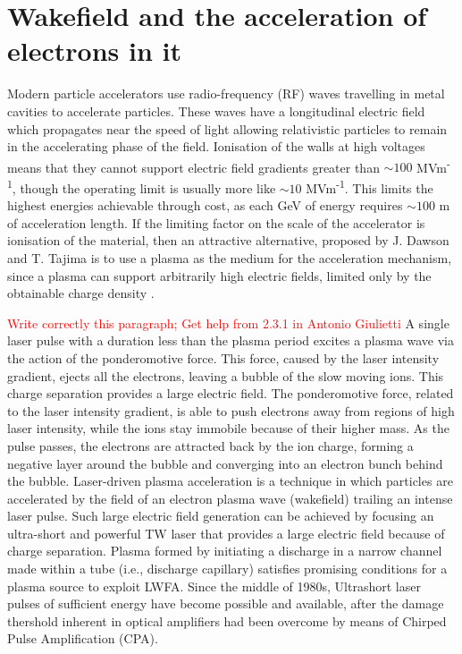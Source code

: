 \documentclass[nofonts]{tufte-book}
\begin{document}
\section{Wakefield and the acceleration of electrons in it}\label{sec:wakefield} 
Modern particle accelerators use radio-frequency (RF) waves travelling in metal cavities to accelerate particles. These waves have a longitudinal electric field which propagates near the speed of light allowing relativistic particles to remain in the accelerating phase of the field. Ionisation of the walls at high voltages means that they cannot support electric field gradients greater than $\sim 100$ MVm\textsuperscript{-1}, though the operating limit is usually more like $\sim 10$ MVm\textsuperscript{-1}. This limits the highest energies achievable through cost, as each GeV of energy requires $\sim 100$ m of acceleration length.
If the limiting factor on the scale of the accelerator is ionisation of the material, then an attractive alternative, proposed by J. Dawson and T. Tajima\cite{Tajima1979} is to use a plasma as the medium for the acceleration mechanism, since a plasma can support arbitrarily high electric fields, limited only by the obtainable charge density \cite{Esarey2009}.

\textcolor{red}{Write correctly this paragraph; Get help from 2.3.1 in Antonio Giulietti}
 A single laser pulse with a duration less than the plasma period excites a plasma wave via the action of the ponderomotive force. This force, caused by the laser intensity gradient, ejects all the electrons, leaving a bubble of the slow moving ions. This charge separation provides a large electric field. The ponderomotive force, related to the laser intensity gradient, is able to push electrons away from regions of high laser intensity, while the ions stay immobile because of their higher mass. As the pulse passes, the electrons are attracted back by the ion charge, forming a negative layer around the bubble and converging into an electron bunch behind the bubble.
Laser-driven plasma acceleration is a technique in which particles are accelerated by the field of an electron plasma wave (wakefield) trailing an intense laser pulse. Such large electric field generation can be achieved by focusing an ultra-short and powerful TW laser that provides a large electric field because of charge separation. Plasma formed by initiating a discharge in a narrow channel made within a tube (i.e., discharge capillary) satisfies promising
conditions for a plasma source to exploit LWFA. Since the middle of 1980s, Ultrashort laser pulses of sufficient energy have become possible and available, after the damage thershold inherent in optical amplifiers had been overcome by means of Chirped Pulse Amplification (CPA)\cite{Strickland1985}.
\end{document}
